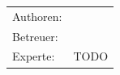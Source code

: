 \begin{titlepage}
\begin{center}
	\vspace{5ex}
	\begin{framed}
		\timeperiod
	\end{framed}
\end{center}

\vspace{11ex}
\begin{tabular}{ll} %
	Authoren:        & \authors    \\
	Betreuer:        & \advisor    \\
	Experte:         & TODO    \\
\end{tabular}

\end{titlepage}

\restoregeometry %
